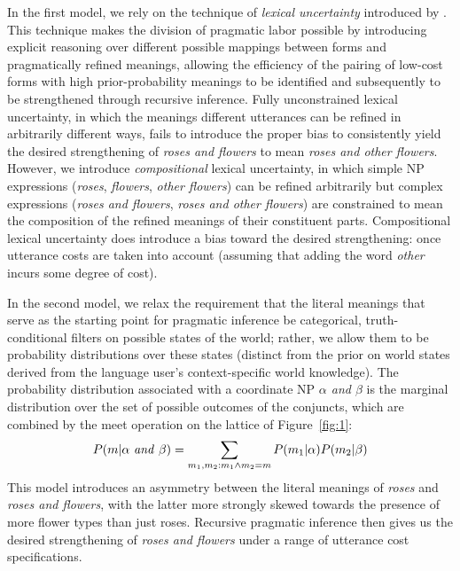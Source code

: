 \documentclass[11pt]{article}
\begin{document}
In the first model, we rely on the technique of \emph{lexical
  uncertainty} introduced by \citet{bergen-goodman-levy:2012}.  This
technique makes the division of pragmatic labor possible by
introducing explicit reasoning over different possible mappings
between forms and pragmatically refined meanings, allowing the
efficiency of the pairing of low-cost forms with high
prior-probability meanings to be identified and subsequently
to be strengthened through recursive inference.  Fully unconstrained lexical
uncertainty, in which the meanings different utterances can be refined
in arbitrarily different ways, fails to introduce the proper bias to
consistently yield the desired strengthening of \emph{roses and flowers} to
mean \emph{roses and other flowers}.  However, we introduce
\emph{compositional} lexical uncertainty, in which simple NP
expressions (\emph{roses}, \emph{flowers}, \emph{other flowers}) can
be refined arbitrarily but complex expressions (\emph{roses and
  flowers}, \emph{roses and other flowers}) are constrained to mean
the composition of the refined meanings of their constituent parts.
Compositional lexical uncertainty does introduce a bias toward the
desired strengthening: once utterance costs are taken into account
(assuming that adding the word \emph{other} incurs some degree of
cost). 

In the second model, we relax the requirement that the literal
meanings that serve as the starting point for pragmatic inference be
categorical, truth-conditional filters on possible states of the world; rather, we allow
them to be probability distributions over these states (distinct from
the prior on world states derived from the language user's
context-specific world knowledge).  The probability distribution
associated with a coordinate NP \emph{$\alpha$ and $\beta$} is the
marginal distribution over the set of possible outcomes of the
conjuncts, which are combined by the meet operation on the lattice of
Figure~\ref{fig:1}:
%
    \begin{align*}
      P(m|\alpha\ \text{\emph{and}}\ \beta) = \sum_{m_1,m_2:m_1 \wedge m_2 = m} P(m_1|\alpha) P(m_2|\beta)
    \end{align*}
%
    This model introduces an asymmetry between the literal
    meanings of \emph{roses} and \emph{roses and flowers}, with the
    latter more strongly skewed towards the presence of more flower
    types than just roses. Recursive pragmatic inference then gives us
    the desired strengthening of \emph{roses and flowers} under a
    range of utterance cost specifications.






\def\thebibliography#1{\section*{References}
  \small
   \list
   {[\arabic{enumi}]}{\leftmargin \parindent
     \itemindent -\parindent
     \itemsep 0ex plus 1pt
     \parsep 0.1ex plus 1pt minus 1pt
     \usecounter{enumi}}
     \def\newblock{\hskip .11em plus .33em minus .07em}
     \sloppy\clubpenalty4000\widowpenalty4000
     \sfcode`\.=1000\relax}

%

\end{document}
